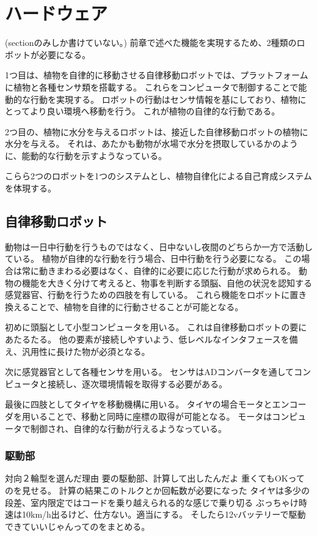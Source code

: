 \chapter{ハードウェア}
(sectionのみしか書けていない。)
前章で述べた機能を実現するため、2種類のロボットが必要になる。
\par 1つ目は、植物を自律的に移動させる自律移動ロボットでは、プラットフォームに植物と各種センサ類を搭載する。
これらをコンピュータで制御することで能動的な行動を実現する。
ロボットの行動はセンサ情報を基にしており、植物にとってより良い環境へ移動を行う。
これが植物の自律的な行動である。
\par 2つ目の、植物に水分を与えるロボットは、接近した自律移動ロボットの植物に水分を与える。
それは、あたかも動物が水場で水分を摂取しているかのように、能動的な行動を示すようなっている。
\par こらら2つのロボットを1つのシステムとし、植物自律化による自己育成システムを体現する。

\section{自律移動ロボット}
動物は一日中行動を行うものではなく、日中ないし夜間のどちらか一方で活動している。
植物が自律的な行動を行う場合、日中行動を行う必要になる。
この場合は常に動きまわる必要はなく、自律的に必要に応じた行動が求められる。
動物の機能を大きく分けて考えると、物事を判断する頭脳、自他の状況を認知する感覚器官、行動を行うための四肢を有している。
これら機能をロボットに置き換えることで、植物を自律的に行動させることが可能となる。
\par 初めに頭脳として小型コンピュータを用いる。
これは自律移動ロボットの要にあたるたる。
他の要素が接続しやすいよう、低レベルなインタフェースを備え、汎用性に長けた物が必須となる。
\par 次に感覚器官として各種センサを用いる。
センサはADコンバータを通してコンピュータと接続し、逐次環境情報を取得する必要がある。
\par 最後に四肢としてタイヤを移動機構に用いる。
タイヤの場合モータとエンコーダを用いることで、移動と同時に座標の取得が可能となる。
モータはコンピュータで制御され、自律的な行動が行えるようなっている。

\subsection{駆動部}
対向２輪型を選んだ理由
要の駆動部、計算して出したんだよ
重くてもOKってのを見せる。
計算の結果このトルクとか回転数が必要になった
タイヤは多少の段差、室内限定ではコードを乗り越えられる的な感じで乗り切る
ぶっちゃけ時速は10km/h出るけど、仕方ない。適当にする。
そしたら12vバッテリーで駆動できていいじゃんってのをまとめる。

